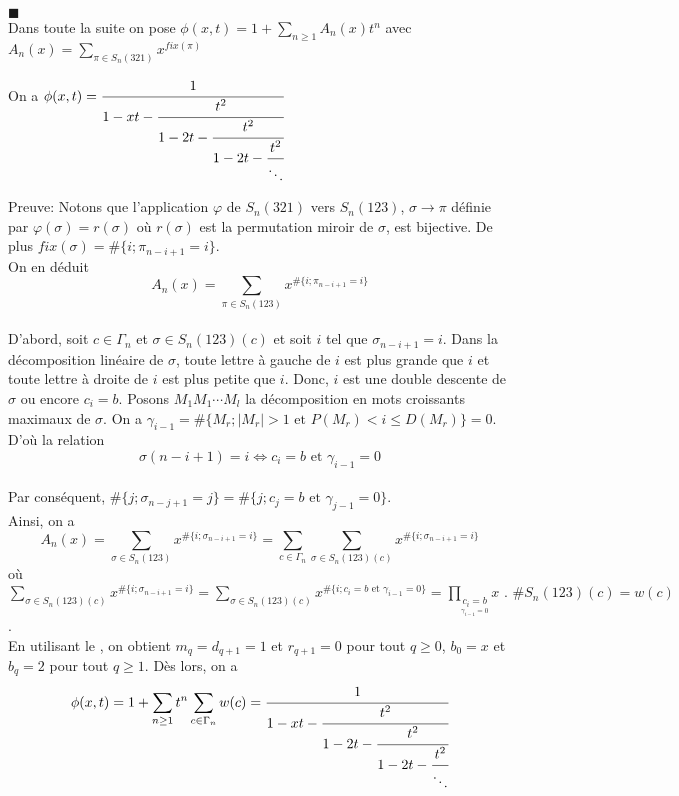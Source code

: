 $\blacksquare$\vspace{5pt}\\
Dans toute la suite on pose $\phi(x, t)= 1 + \sum\limits_{n\geq 1}A_{n}(x)t^{n}$ avec $A_{n}(x)=\sum\limits_{\pi \in S_{n}(321)}x^{fix(\pi)}$\\
\begin{proposition}
	On a $\phi(x,t)=\cfrac{1}{1-xt-\cfrac{t^{2}}{1-2t-\cfrac{t^{2}}{1-2t-\cfrac{t^{2}}{\ddots}}}}$
\end{proposition}
Preuve: Notons que l'application $\varphi$ de $S_{n}(321)$ vers $S_{n}(123)$, $\sigma \longrightarrow \pi$ définie par $\varphi(\sigma)=r(\sigma)$ où $r(\sigma)$ est la permutation miroir de $\sigma$, est bijective. De plus $fix(\sigma)=\#\{i; \pi_{n-i+1}=i\}$. \vspace{5pt}\\
On en déduit $$A_{n}(x)=\sum\limits_{\pi \in S_{n}(123)}x^{\#\{i; \pi_{n-i+1}=i\}}$$\\
D'abord, soit $c\in \Gamma_{n}$ et $\sigma \in S_{n}(123)(c)$ et soit $i$ tel que $\sigma_{n-i+1}=i$. Dans la décomposition linéaire de $\sigma $, toute lettre à gauche de $i$ est plus grande que $i$ et toute lettre à droite de $i$ est plus petite que $i$. Donc, $i$ est une double descente de $\sigma $ ou encore $c_{i}=b$.
Posons $M_{1}M_{1} \cdots M_{l}$ la décomposition en mots croissants maximaux de $\sigma$.
On a $\gamma_{i-1}=\#\{M_{r}; | M_{r} |>1 \text{ et }P(M_{r})<i\leq D(M_{r})\}=0$.\vspace{5pt}\\
D'où la relation $$\sigma(n-i+1)=i \iff c_{i}=b \text{ et }\gamma_{i-1}=0$$\\
Par conséquent, \text{ }$\#\{j; \sigma_{n-j+1}=j\}=\#\{j; c_{j}=b \text{ et }\gamma_{j-1}=0\}$.\vspace{10pt}\\
Ainsi, on a
$$A_{n}(x)=\sum\limits_{\sigma \in S_{n}(123)}x^{\#\{i; \sigma_{n-i+1}=i\}}=\sum\limits_{c\in \Gamma_{n}} \sum\limits_{\sigma \in S_{n}(123)(c)}x^{\#\{i; \sigma_{n-i+1}=i\}} $$ où $ \sum\limits_{\sigma \in S_{n}(123)(c)}x^{\#\{i; \sigma_{n-i+1}=i\}} = \sum\limits_{\sigma \in S_{n}(123)(c)}x^{\#\{i; c_{i}=b \text{ et }\gamma_{i-1}=0\}} = \prod\limits_{\underset{\gamma_{i-1}=0}{c_{i}=b}}x \text{ . }\#S_{n}(123)(c)=w(c)$.\\
En utilisant le , on obtient  $m_{q}=d_{q+1}=1$ et $r_{q+1}=0$ pour tout $q\geq 0$, $b_{0}=x$ et $b_{q}=2$ pour tout $q\geq 1$.
Dès lors, on a $$\phi(x, t) = 1 + \sum\limits_{n\geq 1}t^{n} \sum\limits_{c\in \Gamma_{n}}w(c) = \cfrac{1}{1-xt-\cfrac{t^{2}}{1-2t-\cfrac{t^{2}}{1-2t-\cfrac{t^{2}}{\ddots}}}}$$\\

